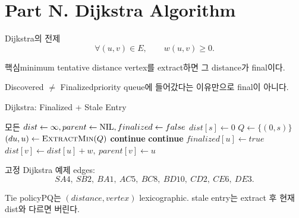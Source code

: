 \section{Part N. Dijkstra Algorithm}
\begin{frame}{Dijkstra의 전제}
\[
\forall (u,v)\in E,\qquad w(u,v)\ge0.
\]
\begin{block}{핵심}minimum tentative distance vertex를 extract하면 그 distance가 final이다.\end{block}
\begin{alertblock}{Discovered \(\ne\) Finalized}priority queue에 들어갔다는 이유만으로 final이 아니다.\end{alertblock}
\end{frame}
\begin{frame}{Dijkstra: Finalized + Stale Entry}
\scriptsize\begin{algorithmic}[1]
\State 모든 \(dist\gets\infty,parent\gets\mathrm{NIL},finalized\gets false\)
\State \(dist[s]\gets0\)
\State \(Q\gets\{(0,s)\}\)
\State \((du,u)\gets\Call{ExtractMin}{Q}\)
\State\textbf{continue}\EndIf
{}\State\textbf{continue}\EndIf
\State \(finalized[u]\gets true\)
\State \(dist[v]\gets dist[u]+w,\ parent[v]\gets u\)
\State {}\EndIf\EndFor\EndWhile\EndProcedure
\end{algorithmic}
\end{frame}
\begin{frame}{고정 Dijkstra 예제}
\small edges:
\[
SA4,\ SB2,\ BA1,\ AC5,\ BC8,\ BD10,\ CD2,\ CE6,\ DE3.
\]
\begin{block}{Tie policy}PQ는 \((distance,vertex)\) lexicographic. stale entry는 extract 후 현재 dist와 다르면 버린다.\end{block}
\end{frame}

